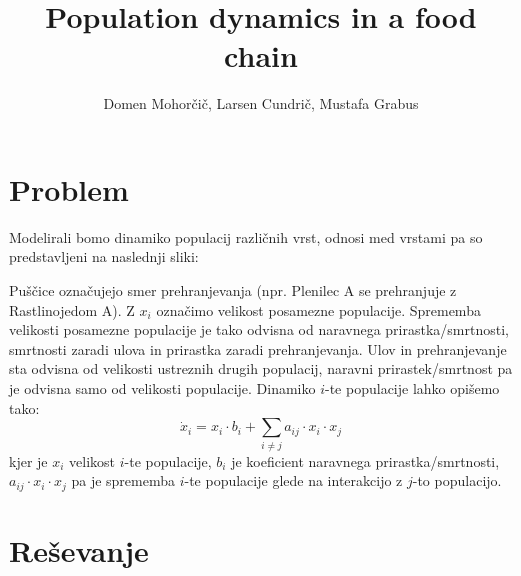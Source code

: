 \documentclass[a4paper, 12pt]{article}
\begin{document}
\title{Population dynamics in a food chain}
\author{Domen Mohorčič, Larsen Cundrič, Mustafa Grabus}
\maketitle

\section{Problem}
Modelirali bomo dinamiko populacij različnih vrst, odnosi med vrstami pa so predstavljeni
na naslednji sliki: \\
\begin{center}
\end{center}
Puščice označujejo smer prehranjevanja (npr. Plenilec A se prehranjuje z Rastlinojedom A).
Z $ x_{i} $ označimo velikost posamezne populacije. Sprememba velikosti posamezne populacije
je tako odvisna od naravnega prirastka/smrtnosti, smrtnosti zaradi ulova in prirastka zaradi
prehranjevanja. Ulov in prehranjevanje sta odvisna od velikosti ustreznih drugih populacij,
naravni prirastek/smrtnost pa je odvisna samo od velikosti populacije. Dinamiko $ i $-te
populacije lahko opišemo tako:
\begin{equation}
	\dot x_{i} = x_{i}\cdot b_{i} + \sum_{i \not = j} a_{ij}\cdot x_{i}\cdot x_{j}
\end{equation}
kjer je $ x_{i} $ velikost $ i $-te populacije, $ b_{i} $ je koeficient naravnega prirastka/smrtnosti,
$ a_{ij}\cdot x_{i}\cdot x_{j} $ pa je sprememba $ i $-te populacije glede na interakcijo z $ j $-to populacijo.

\section{Reševanje}
\end{document}
